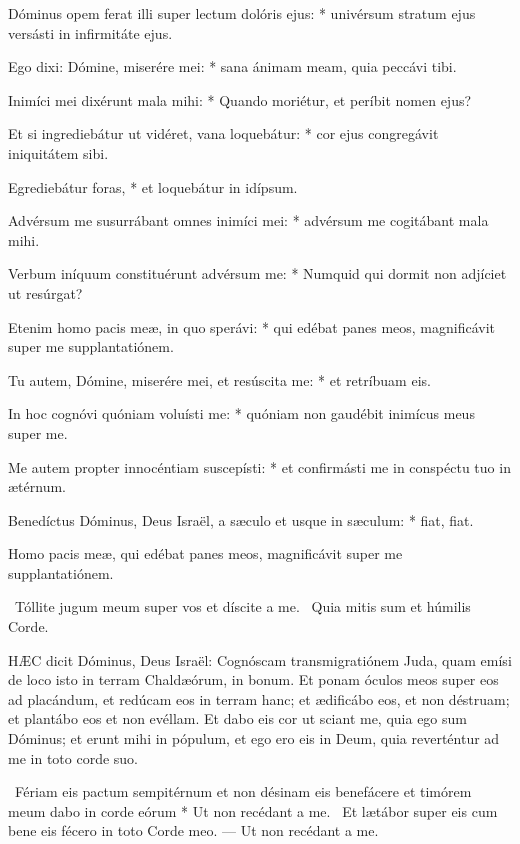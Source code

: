Dóminus opem ferat illi super lectum dolóris ejus: * univérsum stratum ejus versásti in infirmitáte ejus.

Ego dixi: Dómine, miserére mei: * sana ánimam meam, quia peccávi tibi.

Inimíci mei dixérunt mala mihi: * Quando moriétur, et períbit nomen ejus?

Et si ingrediebátur ut vidéret, vana loquebátur: * cor ejus congregávit iniquitátem sibi.

Egrediebátur foras, * et loquebátur in idípsum.

Advérsum me susurrábant omnes inimíci mei: * advérsum me cogitábant mala mihi.

Verbum iníquum constituérunt advérsum me: * Numquid qui dormit non adjíciet ut resúrgat?

Etenim homo pacis meæ, in quo sperávi: * qui edébat panes meos, magnificávit super me supplantatiónem.

Tu autem, Dómine, miserére mei, et resúscita me: * et retríbuam eis.

In hoc cognóvi quóniam voluísti me: * quóniam non gaudébit inimícus meus super me.

Me autem propter innocéntiam suscepísti: * et confirmásti me in conspéctu tuo in ætérnum.

Benedíctus Dóminus, Deus Israël, a sæculo et usque in sæculum: * fiat, fiat.

 Homo pacis meæ, qui edébat panes meos, magnificávit super me supplantatiónem.

\V\ Tóllite jugum meum super vos et díscite a me. \R\ Quia mitis sum et húmilis Corde.



\lettrine[lines=2]{H}{ÆC} dicit Dóminus, Deus Israël: Cognóscam transmigratiónem Juda, quam emísi de loco isto in terram Chaldæórum, in bonum. Et ponam óculos meos super eos ad placándum, et redúcam eos in terram hanc; et ædificábo eos, et non déstruam; et plantábo eos et non evéllam. Et dabo eis cor ut sciant me, quia ego sum Dóminus; et erunt mihi in pópulum, et ego ero eis in Deum, quia reverténtur ad me in toto corde suo.

\R\ Fériam eis pactum sempitérnum et non désinam eis benefácere et timórem meum dabo in corde eórum * Ut non recédant a me. \V\ Et lætábor super eis cum bene eis fécero in toto Corde meo. --- Ut non recédant a me.

